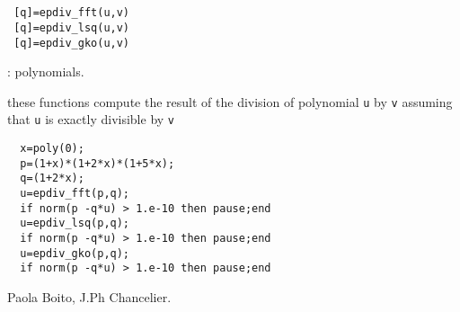 \begin{mandesc}
  \\ 
  \\ 
\end{mandesc}
\begin{calling_sequence}
\begin{verbatim}
 [q]=epdiv_fft(u,v)
 [q]=epdiv_lsq(u,v)
 [q]=epdiv_gko(u,v)
\end{verbatim}
\end{calling_sequence}
\begin{parameters}
  \begin{varlist}
    : polynomials. 
  \end{varlist}
\end{parameters}
\begin{mandescription}
  these functions compute the result of the division of polynomial \verb+u+ by 
  \verb+v+ assuming that \verb+u+ is exactly divisible by \verb+v+
\end{mandescription}
\begin{examples}
  \begin{Verbatim}
  x=poly(0);
  p=(1+x)*(1+2*x)*(1+5*x);
  q=(1+2*x);
  u=epdiv_fft(p,q);
  if norm(p -q*u) > 1.e-10 then pause;end 
  u=epdiv_lsq(p,q);
  if norm(p -q*u) > 1.e-10 then pause;end 
  u=epdiv_gko(p,q);
  if norm(p -q*u) > 1.e-10 then pause;end 
  \end{Verbatim}
\end{examples}
\begin{manseealso}
\end{manseealso}
\begin{authors}
  Paola Boito,  J.Ph Chancelier. 
\end{authors}

